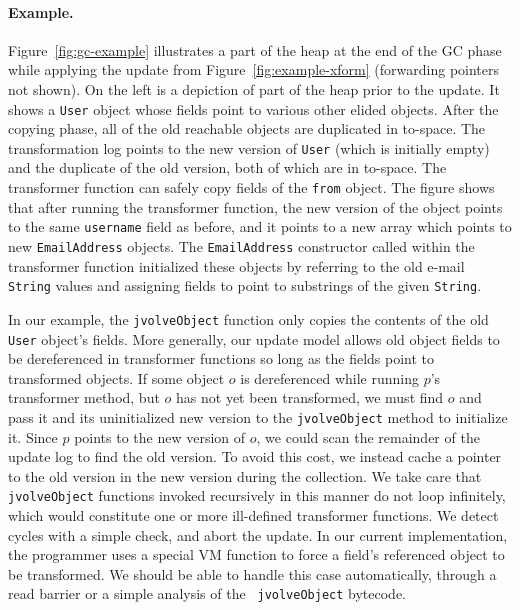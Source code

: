 \paragraph{Example.}
Figure~\ref{fig:gc-example} illustrates a part of the heap at the end
of the GC phase while applying the update from
Figure~\ref{fig:example-xform} (forwarding pointers not shown).  On the left is a depiction of part of the heap prior
to the update.  It shows a {\tt User} object whose fields point to
various other elided objects.  After the copying phase, all of the old
reachable objects are duplicated in to-space.  The
transformation log points to the new version of {\tt User} (which
is initially empty) and the duplicate of the old version, both of
which are in to-space.  The transformer function can safely copy
fields of the {\tt from} object. The figure shows that after
running the transformer function, the new version of the object points
to the same {\tt username} field as before, and it points to a new
array which points to new {\tt EmailAddress} objects. The
{\tt EmailAddress} constructor called within the transformer function initialized these objects by
referring to the old e-mail 
{\tt String} values and assigning fields to point to substrings of
the given {\tt String}.

In our example, the {\tt jvolveObject} function only copies the
contents of the old {\tt User} object's fields.  More generally,
our update model allows old object fields to be dereferenced in
transformer functions so long as the fields point to transformed
objects.  If some object $o$ is dereferenced while running $p$'s
transformer method, but $o$ has not yet been transformed, we must
find $o$ and pass it and its uninitialized new version to the
{\tt jvolveObject} method to initialize
it.  Since $p$ points to the new version of $o$, we could scan the
remainder of the update log to find the old version.  To avoid
this cost, we instead cache a pointer to the old
version in the new version during the collection.
We take care that {\tt jvolveObject} functions
invoked recursively in this manner do not loop infinitely,
which would constitute one or more ill-defined transformer
functions. We detect cycles with a simple check, and abort the update.
In our current implementation, the programmer uses a
special VM function to force a field's referenced object to be
transformed.  We should be able to handle this case
automatically, through a read barrier or a simple analysis of the {\tt
  jvolveObject} bytecode.  


